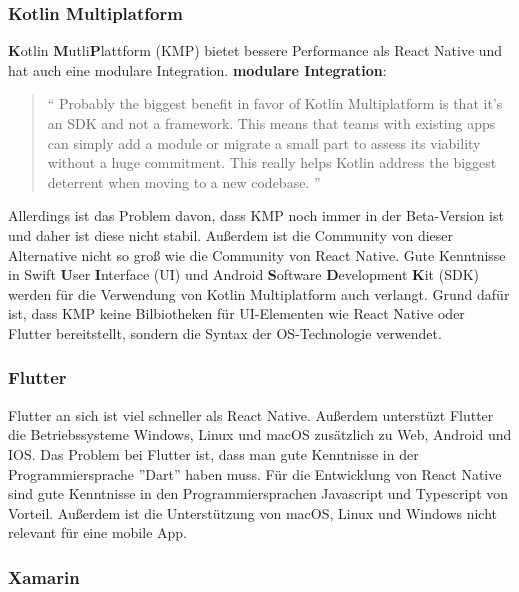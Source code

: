 \begin{spacing}{1}
    \subsubsection{Kotlin Multiplatform}
    \textbf{K}otlin \textbf{M}utli\textbf{P}lattform (KMP) bietet bessere Performance als React Native und hat auch eine modulare Integration.
    \newline
    \textbf{modulare Integration}: \begin{quotation}
        ``
        Probably the biggest benefit in favor of Kotlin Multiplatform is that it’s
        an SDK and not a framework. This means that teams with existing apps can
        simply add a module or migrate a small part to assess its viability without
        a huge commitment. This really helps Kotlin address the biggest deterrent
        when moving to a new codebase.
        ''
        \cite{kotlin-multiplatform-vs-react-native}
    \end{quotation}
    Allerdings ist das Problem davon, dass KMP noch immer in der Beta-Version ist und daher ist diese nicht stabil.
    Außerdem  ist die Community von dieser Alternative nicht so groß wie die Community von React Native.
    Gute Kenntnisse in Swift \textbf{U}ser \textbf{I}nterface (UI) und Android \textbf{S}oftware \textbf{D}evelopment \textbf{K}it (SDK) werden für die Verwendung von Kotlin Multiplatform auch verlangt.
    Grund dafür ist, dass KMP keine Bilbiotheken für UI-Elementen wie React Native oder Flutter bereitstellt, sondern die Syntax der OS-Technologie verwendet.
    \cite{kotlin-multiplatform-vs-react-native}
    \subsubsection{Flutter}

    Flutter an sich ist viel schneller als React Native.
    Außerdem unterstüzt Flutter die Betriebssysteme  Windows, Linux und macOS zusätzlich zu Web, Android und IOS.
    \cite{flutter-vs-react-native}
    \newline
    Das Problem bei Flutter ist, dass man gute Kenntnisse in der Programmiersprache ''Dart'' haben muss. \cite{flutter-vs-react-native}
    Für die Entwicklung von React Native sind gute Kenntnisse in den Programmiersprachen Javascript und Typescript von Vorteil.
    Außerdem ist die Unterstützung von macOS, Linux und Windows nicht relevant für eine mobile App.


    \subsubsection{Xamarin}


\end{spacing}
